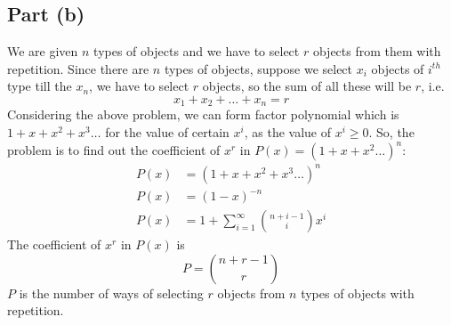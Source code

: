 \documentclass{article}
\begin{document}
{  \subsection{Part (b)}{
    We are given $n$ types of objects and we have to select $r$ objects from them with repetition. \newline
    Since there are $n$ types of objects, suppose we select $x_i$ objects of $i^{th}$ type till the $x_n$, we have to select $r$ objects, so the sum of all these will be $r$, i.e. $$x_1+x_2+\dots+x_n=r$$
    Considering the above problem, we can form factor polynomial which is $1+x+x^2+x^3\dots$ for the value of certain $x^i$, as the value of $x^i \geq 0$. \newline
    So, the problem is to find out the coefficient of $x^r$ in $P(x)=(1+x+x^2\dots)^n$:
    \begin{align*}
      P(x)&=(1+x+x^2+x^3\dots)^n \\
      P(x)&=(1-x)^{-n} \\
      P(x)&=1+ \sum_{i=1}^{\infty} \binom{n+i-1}{i}x^i
    \end{align*}
    The coefficient of $x^r$ in $P(x)$ is $$P=\binom{n+r-1}{r}$$
    $P$ is the number of ways of selecting $r$ objects from $n$ types of objects with repetition.
  }
}
\newpage 
\end{document}
